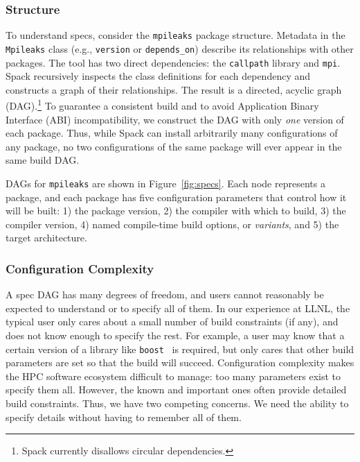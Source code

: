 \subsubsection{Structure}
To understand specs, consider the {\tt mpileaks} package structure.
Metadata in the {\tt Mpileaks} class (e.g., {\tt version} or
{\tt depends\_on}) describe its relationships with other packages.
The tool has two direct dependencies:
the {\tt callpath} library and {\tt mpi}.  Spack recursively inspects the class definitions
for each dependency and constructs a graph of their relationships.  The result
is a directed, acyclic graph (DAG).\footnote{Spack currently disallows
circular dependencies.}
%
To guarantee a consistent build and to avoid
Application Binary Interface (ABI) incompatibility, we construct
the DAG with only {\it one} version of each package.  Thus, while
Spack can install arbitrarily many configurations of any package,
no two configurations of the same package will ever appear in the same build DAG.

DAGs for {\tt mpileaks} are shown in Figure~\ref{fig:specs}.
Each node represents a package, and each package has five configuration parameters that control
how it will be built: 1) the package version, 2) the compiler with which to
build, 3) the compiler version, 4) named compile-time build options, or
{\it variants}, and 5) the target architecture.


\subsubsection{Configuration Complexity}
A spec DAG has many degrees of freedom, and users cannot reasonably be
expected to understand or to specify all of them.  In our experience at LLNL,
the typical user only cares about a small number of build constraints (if any),
and does not know enough to
specify the rest. For example, a user may know that a certain version of a library like
{\tt boost}~\cite{boost} is required, but only cares that other build parameters are set so that
the build will succeed.
%
Configuration complexity makes the HPC software ecosystem difficult to manage:
too many parameters exist to specify them all. However, the known and
important ones often provide detailed build constraints. Thus, we have two
competing concerns.  We need the ability to specify details
without having to remember all of them.

